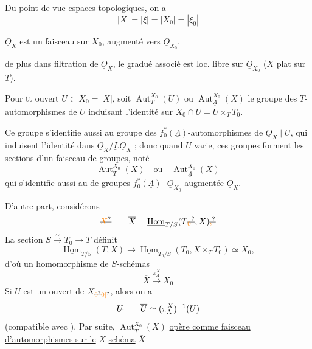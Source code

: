 Du point de vue espaces topologiques, on a
\[
|X|=|\xi|=|X_0|=|\xi_0|
\]

$\underline{O}_X$ est un faisceau  sur $X_0$, augmenté vers $\underline{O}_{X_0}$,

de plus dans  filtration  de $\underline{O}_X$,  le gradué associé est loc. libre sur $\underline{O}_{X_0}$ ($X$ plat sur $T$).

 Pour tt ouvert $U\subset X_0=|X|$, soit $\operatorname{Aut}^{X_0}_{T}(U)$ ou $\operatorname{Aut}^{X_0}_{\underline{\Lambda}}(X)$ le groupe des $T$-automorphismes de $U$ induisant l'identité sur $X_0\cap U=U\times_T T_0$.

Ce groupe s'identifie aussi au groupe des $f_0^*(\underline{\Lambda})$-automorphismes de $\underline{O}_X\mid U$, qui induisent l'identité dans $\underline{O}_X/\underline{I}.\underline{O}_X$ ; donc quand $U$ varie, ces groupes forment les sections d'un faisceau de groupes, noté
\[
\underline{\operatorname{Aut}}^{X_0}_T(X)\quad\text{ou}\quad\underline{\operatorname{Aut}}^{X_0}_{\underline{\Lambda}}(X)
\]
qui s'identifie aussi au  de  groupes   $f_0^*(\underline{\Lambda})$- $\underline{O}_{X_0}$-augmentée $\underline{O}_X$.

D'autre part, considérons  
\[
\deleted{\unsure{X}}\qquad\overline X=\underline{\operatorname{Hom}}_{T/S}(T\deleted{\unsure{_0}},X)\deleted{\unsure{,}}
\]
La  section $S\xrightarrow{\sim}T_0\longrightarrow T$ définit
\[
\underline{\operatorname{Hom}}_{T/S}(T,X)\longrightarrow\underline{\operatorname{Hom}}_{T_0/S}(T_0,X\times_T T_0)\simeq X_0,
\]
d'où un homomorphisme de $S$-schémas
\[
\overline X\xrightarrow{\pi_\Lambda^X}X_0
\]
Si $U$ est un ouvert de $X_{\deleted{\unsure{0}}\unsure{0|{}}}$, alors on a
\[
\deleted{U}\qquad\overline U\simeq(\pi_\Lambda^X)^{-1}(U)
\]
(compatible avec ).
Par suite, $\underline{\operatorname{Aut}}^{X_0}_T(X)$ \uline{opère comme faisceau d'automorphismes sur le} $X$-\uline{schéma} $\overline X$

